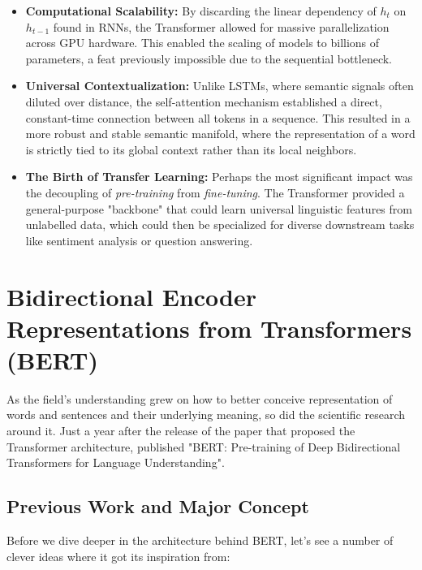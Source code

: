 \documentclass[a4paper,12pt]{article}
\begin{document}
\begin{itemize}
    \item \textbf{Computational Scalability:} By discarding the linear dependency of $h_{t}$ on $h_{t-1}$ found in RNNs, the Transformer allowed for massive parallelization across GPU hardware. This enabled the scaling of models to billions of parameters, a feat previously impossible due to the sequential bottleneck.
    \item \textbf{Universal Contextualization:} Unlike LSTMs, where semantic signals often diluted over distance, the self-attention mechanism established a direct, constant-time connection between all tokens in a sequence. This resulted in a more robust and stable semantic manifold, where the representation of a word is strictly tied to its global context rather than its local neighbors.
    \item \textbf{The Birth of Transfer Learning:} Perhaps the most significant impact was the decoupling of \textit{pre-training} from \textit{fine-tuning}. The Transformer provided a general-purpose "backbone" that could learn universal linguistic features from unlabelled data, which could then be specialized for diverse downstream tasks like sentiment analysis or question answering.
\end{itemize}

\section{Bidirectional Encoder Representations from Transformers (BERT)}
As the field's understanding grew on how to better conceive representation of words and sentences and their underlying meaning, so did the scientific research around it. Just a year after the release of the paper that proposed the Transformer architecture, \cite{devlin2019bert} published "BERT: Pre-training of Deep Bidirectional Transformers for Language Understanding".

\subsection{Previous Work and Major Concept}
Before we dive deeper in the architecture behind BERT, let's see a number of clever ideas where it got its inspiration from:
\end{document}
